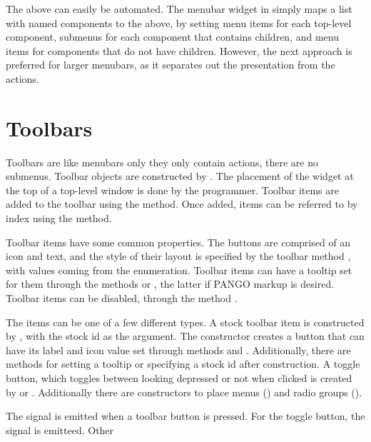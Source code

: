 The above can easily be automated. The menubar widget in
 simply maps a list with named components to the
above, by setting menu items for each top-level component, submenus for
each component that contains children, and menu items for components
that do not have children. However, the next approach is preferred for
larger menubars, as it separates out the presentation from the actions.

\section{Toolbars}
\label{sec:RGtk2:toolbars}

Toolbars are like menubars only they only contain actions, there are
no submenus. Toolbar objects are constructed by
. The placement of the widget at the top of a
top-level window is done by the programmer. Toolbar items are added to
the toolbar using the  method. Once added,
items can be referred to by index using the \code{[[} method.

Toolbar items have some common properties. The buttons are comprised
of an icon and text, and the style of their layout is specified by the
toolbar method , with values coming from
the  enumeration. Toolbar items can have a
tooltip set for them through the methods
 or
, the latter if PANGO markup is
desired. Toolbar items can be disabled, through the method .

The items can be one of a few different types. A stock toolbar item is
constructed by , with the
stock id as the argument. The constructor
 creates a button that can have its
label and icon value set through methods
 and
. Additionally, there are
methods for setting a tooltip or specifying a stock id after
construction. A toggle button, which toggles between looking depressed
or not when clicked is created by  or .
Additionally there are constructors to place menus
() and radio groups ().
  
The  signal is emitted when a toolbar button is
pressed. For the toggle button, the  signal is emitteed. Other



